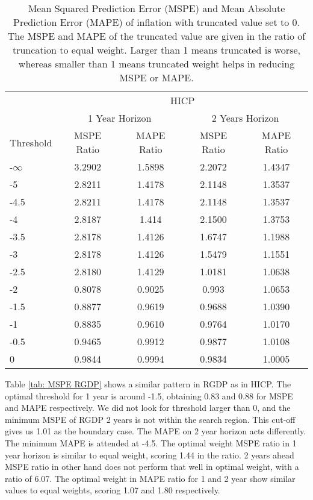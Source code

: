 \documentclass[11pt]{article}
\begin{document}
\begin{table}[!h]
	\centering
	\caption{Mean Squared Prediction Error (MSPE) and Mean Absolute Prediction Error (MAPE) of inflation with truncated value set to 0. The MSPE and MAPE of the truncated value are given in the ratio of truncation to equal weight. Larger than 1 means truncated is worse, whereas smaller than 1 means truncated weight helps in reducing MSPE or MAPE.}
	\label{tab: MSPE HICP}
	\begin{tabular}{lcccc}
		\hline\hline
		&                        \multicolumn{4}{c}{HICP}                         \\
		\cmidrule(lr){2-5}                              & \multicolumn{2}{c}{1 Year Horizon} & \multicolumn{2}{c}{2 Years Horizon} \\
		\cmidrule(lr){2-3} \cmidrule(lr){4-5}
		Threshold & MSPE Ratio &    MAPE Ratio    & MSPE Ratio &    MAPE Ratio    \\ \hline
		-$\infty$ & 3.2902 & 1.5898 & 2.2072 & 1.4347\\ 
		-5 & 2.8211 & 1.4178 & 2.1148 & 1.3537\\ 
		-4.5 & 2.8211 & 1.4178 & 2.1148 & 1.3537\\ 
		-4 & 2.8187 & 1.414 & 2.1500 & 1.3753\\ 
		-3.5 & 2.8178 & 1.4126 & 1.6747 & 1.1988\\ 
		-3 & 2.8178 & 1.4126 & 1.5479 & 1.1551\\ 
		-2.5 & 2.8180 & 1.4129 & 1.0181 & 1.0638\\ 
		-2 & 0.8078 & 0.9025 & 0.993 & 1.0653\\ 
		-1.5 & 0.8877 & 0.9619 & 0.9688 & 1.0390\\ 
		-1 & 0.8835 & 0.9610 & 0.9764 & 1.0170\\ 
		-0.5 & 0.9465 & 0.9912 & 0.9877 & 1.0108\\ 
		0 & 0.9844 & 0.9994 & 0.9834 & 1.0005\\ 		 \hline\hline
	\end{tabular}
\end{table}

Table \ref{tab: MSPE RGDP} shows a similar pattern in RGDP as in HICP. The optimal threshold for 1 year is around -1.5, obtaining 0.83 and 0.88 for MSPE and MAPE respectively. We did not look for threshold larger than 0, and the minimum MSPE of RGDP 2 years is not within the search region. This cut-off gives us 1.01 as the boundary case. The MAPE on 2 year horizon acts differently. The minimum MAPE is attended at -4.5. The optimal weight MSPE ratio in 1 year horizon is similar to equal weight, scoring 1.44 in the ratio. 2 years ahead MSPE ratio in other hand does not perform that well in optimal weight, with a ratio of 6.07. The optimal weight in MAPE ratio for 1 and 2 year show similar values to equal weights, scoring 1.07 and 1.80 respectively.
\end{document}
